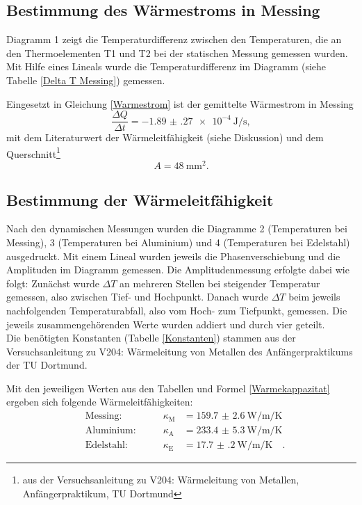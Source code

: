\subsection{Bestimmung des Wärmestroms in Messing}
Diagramm 1 zeigt die Temperaturdifferenz zwischen den Temperaturen, die an den Thermoelementen T1 und T2 bei der statischen Messung gemessen wurden. Mit Hilfe eines Lineals wurde die Temperaturdifferenz im Diagramm (siehe Tabelle \ref{Delta T Messing}) gemessen.

Eingesetzt in Gleichung \eqref{Warmestrom} ist der gemittelte Wärmestrom in Messing
\begin{equation}
	\frac{\Delta Q}{\Delta t} = \SI{-1.89(27)e-4}{\joule\per\second},
\end{equation}
mit dem Literaturwert der Wärmeleitfähigkeit (siehe Diskussion) und dem Querschnitt\footnote{aus der Versuchsanleitung zu V204: Wärmeleitung von Metallen, Anfängerpraktikum, TU Dortmund}
\begin{equation}
	A = \SI{48}{\milli\metre\squared}.
\end{equation}
\clearpage

\subsection{Bestimmung der Wärmeleitfähigkeit}
Nach den dynamischen Messungen wurden die Diagramme 2 (Temperaturen bei Messing), 3 (Temperaturen bei Aluminium) und 4 (Temperaturen bei Edelstahl) ausgedruckt. Mit einem Lineal wurden jeweils die Phasenverschiebung und die Amplituden im Diagramm gemessen. Die Amplitudenmessung erfolgte dabei wie folgt: Zunächst wurde $\Delta T$ an mehreren Stellen bei steigender Temperatur gemessen, also zwischen Tief- und Hochpunkt. Danach wurde $\Delta T$ beim jeweils nachfolgenden Temperaturabfall, also vom Hoch- zum Tiefpunkt, gemessen. Die jeweils zusammengehörenden Werte wurden addiert und durch vier geteilt. \\
Die benötigten Konstanten (Tabelle \ref{Konstanten}) stammen aus der Versuchsanleitung zu V204: Wärmeleitung von Metallen des Anfängerpraktikums der TU Dortmund.







Mit den jeweiligen Werten aus den Tabellen und Formel \eqref{Warmekappazitat} ergeben sich folgende Wärmeleitfähigkeiten:
\begin{align}
	&\text{Messing:}\qquad & \kappa_\text{M} &= \SI{159.7(26)}{\watt\per\metre\per\kelvin} \\
	&\text{Aluminium:}\qquad & \kappa_\text{A} &= \SI{233.4(53)}{\watt\per\metre\per\kelvin} \\
	&\text{Edelstahl:}\qquad & \kappa_\text{E} &= \SI{17.7(2)}{\watt\per\metre\per\kelvin}\quad.
\end{align}


